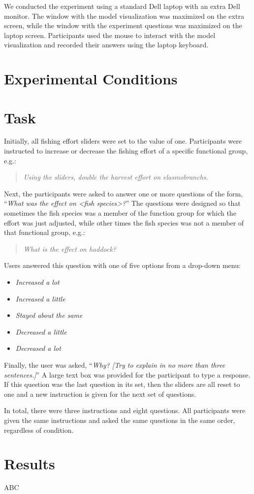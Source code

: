 We conducted the experiment using a standard Dell laptop with an extra Dell monitor.  The window with the model visualization was maximized on the extra screen, while the window with the experiment questions was maximized on the laptop screen.  Participants used the mouse to interact with the model visualization and recorded their answers using the laptop keyboard.

\section{Experimental Conditions}

\section{Task}

Initially, all fishing effort sliders were set to the value of one.  Participants were  instructed to increase or decrease the fishing effort of a specific functional group, e.g.:
\begin{quote}
\textit{Using the sliders, double the harvest effort on elasmobranchs.}
\end{quote}

Next, the participants were asked to answer one or more questions of the form, ``\textit{What was the effect on <fish species>?}''  The questions were designed so that sometimes the fish species was a member of the function group for which the effort was just adjusted, while other times the fish species was not a member of that functional group, e.g.:
\begin{quote}
\textit{What is the effect on haddock?}
\end{quote}
Users answered this question with one of five options from a drop-down menu:
\begin{itemize}
\item \textit{Increased a lot}
\item \textit{Increased a little}
\item \textit{Stayed about the same}
\item \textit{Decreased a little}
\item \textit{Decreased a lot}
\end{itemize}

Finally, the user was asked, ``\textit{Why? [Try to explain in no more than three sentences.]}''  A large text box was provided for the participant to type a response.  If this question was the last question in its set, then the sliders are all reset to one and a new instruction is given for the next set of questions. 

In total, there were three instructions and eight questions.  All participants were given the same instructions and asked the same questions in the same order, regardless of condition.

\section{Results}

ABC
